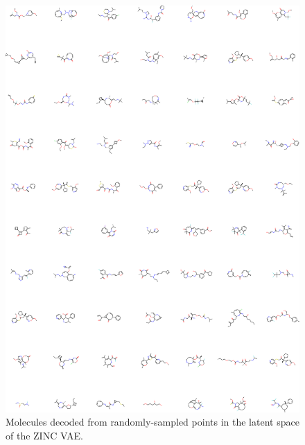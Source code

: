 \begin{figure}[h]
\centering
\includegraphics[width=0.9\columnwidth]{./VAE_random.png}
\caption[Random molecules sampled from Variational Autoencoder]{Molecules decoded from randomly-sampled points in the latent space of the ZINC VAE.}
\label{fig:random_3}
\end{figure}
